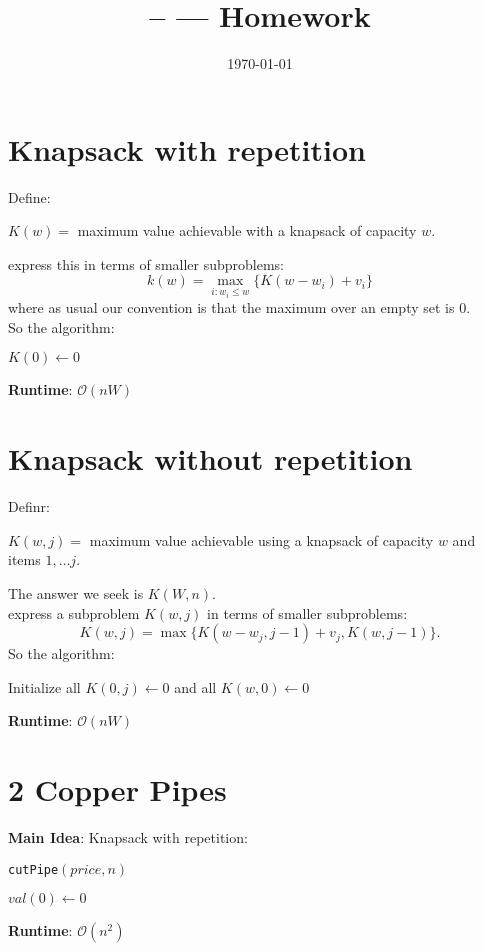 \documentclass[11pt]{article}
\title{\Class-- \Session --- Homework \Homework}
\author{\Name}
\date{\today}
\def\mi{\textbf{Main Idea}: }
\def\rt{\textbf{Runtime}: }
\begin{document}
	\maketitle
	
	\section*{Knapsack with repetition}
	Define:
	\begin{center}
		$K(w) = $ maximum value achievable with a knapsack of capacity $w$.
	\end{center}
	express this in terms of smaller subproblems:
	$$k(w) = \max_{i: w_i \leq w}\{K(w - w_i) + v_i\}$$
	where as usual our convention is that the maximum over an empty set is $0$.\\
	So the algorithm:\\
	\begin{algorithm}[H]
		$K(0) \leftarrow 0$\\
	\end{algorithm}
	\rt  $\mathcal{O}(nW)$
	
	\section*{Knapsack without repetition}
	Definr:
	\begin{center}
		$K(w, j) = $ maximum value achievable using a knapsack of capacity $w$ and items $1, \dots j$.
	\end{center}
	The answer we seek is $K(W, n)$.\\
	express a subproblem $K(w, j)$ in terms of smaller subproblems:
	$$K(w, j) = \max\{K(w - w_j, j-1) + v_j, K(w, j-1)\}.$$
	So the algorithm:\\
	\begin{algorithm}[H]
		Initialize all $K(0, j) \leftarrow 0$ and all $K(w, 0) \leftarrow 0$\\
	\end{algorithm}
	\rt $\mathcal{O}(nW)$
	
	\section*{2  Copper Pipes}
	\mi Knapsack with repetition:\\
	\begin{algorithm}[H]
		\caption{\texttt{cutPipe}$(price, n)$}
		$val(0) \leftarrow 0$\\
	\end{algorithm}
	\rt  $\mathcal{O}(n^2)$
	
\end{document}

